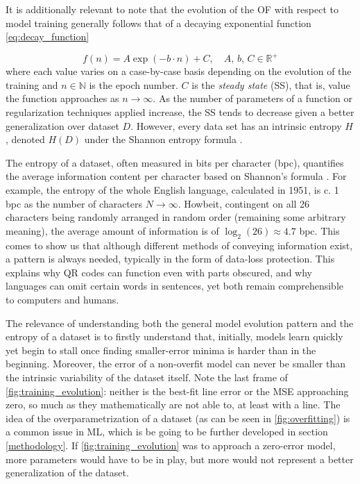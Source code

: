 \documentclass[conference]{IEEEtran}
\begin{document}
It is additionally relevant to note that the evolution of the OF with respect to model training generally follows that of a decaying exponential function \eqref{eq:decay_function}

\begin{equation}
    f(n) = A\exp(-b\cdot n)+C, \quad A,\,b,\,C\in \mathbb{R}^+
    \label{eq:decay_function}
\end{equation}
where each value varies on a case-by-case basis depending on the evolution of the training and $n\in\mathbb{N}$ is the epoch number. $C$ is the \textit{steady state} (SS), that is, value the function approaches as $n\to \infty$. As the number of parameters of a function or regularization techniques applied increase, the SS tends to decrease given a better generalization over dataset $D$. However, every data set has an intrinsic entropy $H$, denoted $H(D)$ under the Shannon entropy formula \cite{shannon1948}.

The entropy of a dataset, often measured in bits per character (bpc), quantifies the average information content per character based on Shannon's formula \cite{shannon1961}. For example, the entropy of the whole English language, calculated in 1951, is c. 1 bpc as the number of characters $N\to \infty$. Howbeit, contingent on all 26 characters being randomly arranged in random order (remaining some arbitrary meaning), the average amount of information is of $\log_{2}(26)\approx 4.7$ bpc. This comes to show us that although different methods of conveying information exist, a pattern is always needed, typically in the form of data-loss protection. This explains why QR codes can function even with parts obscured, and why languages can omit certain words in sentences, yet both remain comprehensible to computers and humans.

The relevance of understanding both the general model evolution pattern and the entropy of a dataset is to firstly understand that, initially, models learn quickly yet begin to stall once finding smaller-error minima is harder than in the beginning. Moreover, the error of a non-overfit model can never be smaller than the intrinsic variability of the dataset itself. Note the last frame of \cref{fig:training_evolution}: neither is the best-fit line error or the MSE approaching zero, so much as they mathematically are not able to, at least with a line. The idea of the overparametrization of a dataset (as can be seen in \cref{fig:overfitting}) is a common issue in ML, which is be going to be further developed in section \ref{methodology}. If \cref{fig:training_evolution} was to approach a zero-error model, more parameters would have to be in play, but more would not represent a better generalization of the dataset.
\end{document}
